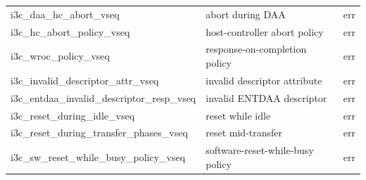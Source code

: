 {\begin{longtable}{@{}>{\ttfamily}l>{\raggedright\arraybackslash}p{}l@{}}
i3c\_daa\_hc\_abort\_vseq             & abort during DAA                & err \\
i3c\_hc\_abort\_policy\_vseq          & host-controller abort policy    & err \\
i3c\_wroc\_policy\_vseq               & response-on-completion policy   & err \\
i3c\_invalid\_descriptor\_attr\_vseq  & invalid descriptor attribute    & err \\
i3c\_entdaa\_invalid\_descriptor\_resp\_vseq & invalid ENTDAA descriptor & err \\
i3c\_reset\_during\_idle\_vseq        & reset while idle                & err \\
i3c\_reset\_during\_transfer\_phases\_vseq & reset mid-transfer         & err \\
i3c\_sw\_reset\_while\_busy\_policy\_vseq & software-reset-while-busy policy & err \\
\end{longtable}
}
